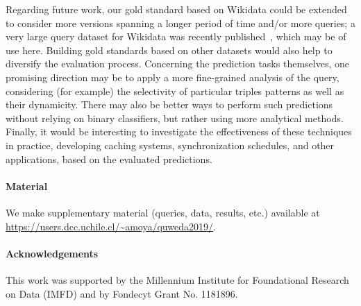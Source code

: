 \documentclass[runningheads]{llncs}
\begin{document}
Regarding future work, our gold standard based on Wikidata could be extended to consider more versions spanning a longer period of time and/or more queries; a very large query dataset for Wikidata was recently published~\cite{MalyshevKGGB18}, which may be of use here. Building gold standards based on other datasets would also help to diversify the evaluation process. Concerning the prediction tasks themselves, one promising direction may be to apply a more fine-grained analysis of the query, considering (for example) the selectivity of particular triples patterns as well as their dynamicity. There may also be better ways to perform such predictions without relying on binary classifiers, but rather using more analytical methods. Finally, it would be interesting to investigate the effectiveness of these techniques in practice, developing caching systems, synchronization schedules, and other applications, based on the evaluated predictions.

\paragraph{Material} We make supplementary material (queries, data, results, etc.) available at \url{https://users.dcc.uchile.cl/~amoya/quweda2019/}.

\paragraph{Acknowledgements} This work was supported by the Millennium Institute for Foundational Research on Data (IMFD) and by Fondecyt Grant No. 1181896.



\end{document}
